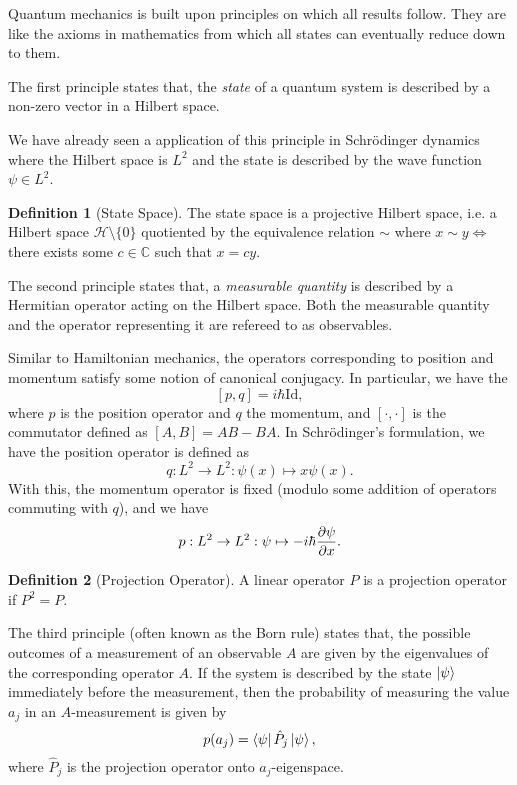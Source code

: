 \documentclass[]{article}
\theoremstyle{definition}
\theoremstyle{definition}
\newtheorem{definition}{Definition}[section]
\begin{document}
Quantum mechanics is built upon principles on which all results follow. They 
are like the axioms in mathematics from which all states can eventually reduce 
down to them.

The first principle states that, the \textit{state} of a quantum system is 
described by a non-zero vector in a Hilbert space.

We have already seen a application of this principle in Schrödinger dynamics 
where the Hilbert space is \(L^2\) and the state is described by the wave 
function \(\psi \in L^2\).

\begin{definition}[State Space]
  The state space is a projective Hilbert space, i.e. a Hilbert space 
  \(\mathcal{H} \setminus \{0\}\) quotiented by the equivalence relation \(\sim\) where 
  \(x \sim y \iff\) there exists some \(c \in \mathbb{C}\) such that 
  \(x = c y\).
\end{definition}

The second principle states that, a \textit{measurable quantity} is described 
by a Hermitian operator acting on the Hilbert space. Both the measurable 
quantity and the operator representing it are refereed to as observables.

Similar to Hamiltonian mechanics, the operators corresponding to position and 
momentum satisfy some notion of canonical conjugacy. In particular, we have the 
\[[p, q] = i \hbar \text{Id},\]
where \(p\) is the position operator and \(q\) the momentum, 
and \([\cdot, \cdot]\) is the commutator defined as \([A, B] = AB - BA\). 
In Schrödinger's formulation, we have the position operator is defined as 
\[q : L^2 \to L^2 : \psi(x) \mapsto x\psi(x).\]
With this, the momentum operator is fixed (modulo some addition of operators 
commuting with \(q\)), and we have 
\[p : L^2 \to L^2 : \psi \mapsto -i \hbar \pdv{\psi}{x}.\]

\begin{definition}[Projection Operator]
  A linear operator \(P\) is a projection operator if \(P^2 = P\).
\end{definition}

The third principle (often known as the Born rule) states that, the possible 
outcomes of a measurement of an observable \(A\) are given by the eigenvalues 
of the corresponding operator \(A\). If the system is described by the state 
\(\ket{\psi}\) immediately before the measurement, then the probability of 
measuring the value \(a_j\) in an \(A\)-measurement is given by 
\[p(a_j) = \bra{\psi}\hat P_j \ket{\psi},\]
where \(\hat P_j\) is the projection operator onto \(a_j\)-eigenspace.
\end{document}
